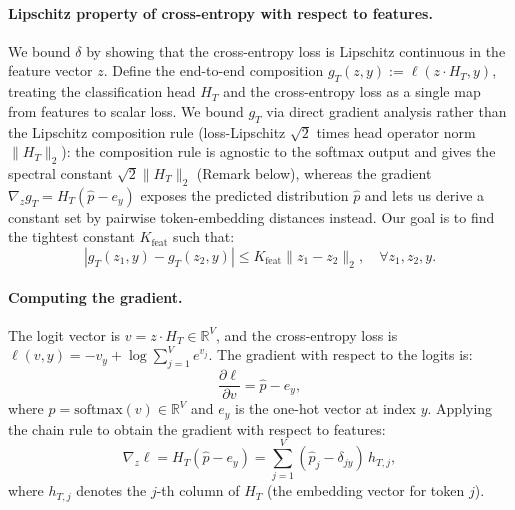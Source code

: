 \paragraph{Lipschitz property of cross-entropy with respect to features.}
We bound $\delta$ by showing that the cross-entropy loss is Lipschitz continuous in the feature vector $z$. Define the end-to-end composition $g_T(z, y) := \ell(z \cdot H_T, y)$, treating the classification head $H_T$ and the cross-entropy loss as a single map from features to scalar loss. We bound $g_T$ via direct gradient analysis rather than the Lipschitz composition rule (loss-Lipschitz $\sqrt{2}$ times head operator norm $\|H_T\|_2$): the composition rule is agnostic to the softmax output and gives the spectral constant $\sqrt{2}\|H_T\|_2$ (Remark below), whereas the gradient $\nabla_z g_T = H_T(\hat{p} - e_y)$ exposes the predicted distribution $\hat{p}$ and lets us derive a constant set by pairwise token-embedding distances instead. Our goal is to find the tightest constant $K_{\mathrm{feat}}$ such that:
\begin{equation}
|g_T(z_1, y) - g_T(z_2, y)| \le K_{\mathrm{feat}} \|z_1 - z_2\|_2, \quad \forall z_1, z_2, y.
\end{equation}

\paragraph{Computing the gradient.}
The logit vector is $v = z \cdot H_T \in \mathbb{R}^V$, and the cross-entropy loss is $\ell(v, y) = -v_y + \log \sum_{j=1}^{V} e^{v_j}$. The gradient with respect to the logits is:
\begin{equation}
\frac{\partial \ell}{\partial v} = \hat{p} - e_y,
\end{equation}
where $\hat{p} = \mathrm{softmax}(v) \in \mathbb{R}^V$ and $e_y$ is the one-hot vector at index $y$. Applying the chain rule to obtain the gradient with respect to features:
\begin{equation}
\nabla_z \ell = H_T (\hat{p} - e_y) = \sum_{j=1}^{V} (\hat{p}_j - \delta_{jy})\, h_{T,j},
\end{equation}
where $h_{T,j}$ denotes the $j$-th column of $H_T$ (the embedding vector for token $j$).

